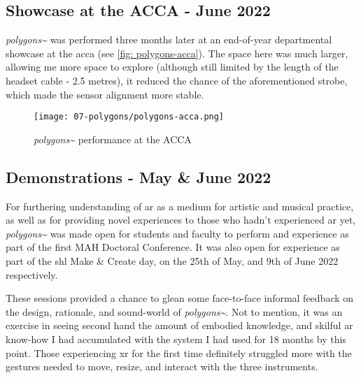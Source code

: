 \subsection{Showcase at the ACCA - June 2022}\label{sec: polygons-performances-acca}
\textit{polygons\textasciitilde{}} was performed three months later at an end-of-year departmental showcase at the \gls{acca} (see \autoref{fig: polygons-acca}). The space here was much larger, allowing me more space to explore (although still limited by the length of the headset cable - 2.5 metres), it reduced the chance of the aforementioned strobe, which made the sensor alignment more stable.

\begin{figure}
    \centering
    \texttt{[image: 07-polygons/polygons-acca.png]}
    \caption{\textit{polygons\textasciitilde{}} performance at the ACCA}
    \label{fig: polygons-acca}
\end{figure}

\subsection{Demonstrations - May \& June 2022}\label{sec: polygons-performances-demos}
For furthering understanding of \gls{ar} as a medium for artistic and musical practice, as well as for providing novel experiences to those who hadn't experienced \gls{ar} yet, \textit{polygons\textasciitilde{}} was made open for students and faculty to perform and experience as part of the first MAH Doctoral Conference. It was also open for experience as part of the \gls{shl} Make \& Create day, on the 25th of May, and 9th of June 2022 respectively.

These sessions provided a chance to glean some face-to-face informal feedback on the design, rationale, and sound-world of \textit{polygons\textasciitilde{}}. Not to mention, it was an exercise in seeing second hand the amount of embodied knowledge, and skilful \gls{ar} know-how I had accumulated with the system I had used for 18 months by this point. Those experiencing \gls{xr} for the first time definitely struggled more with the gestures needed to move, resize, and interact with the three instruments.



